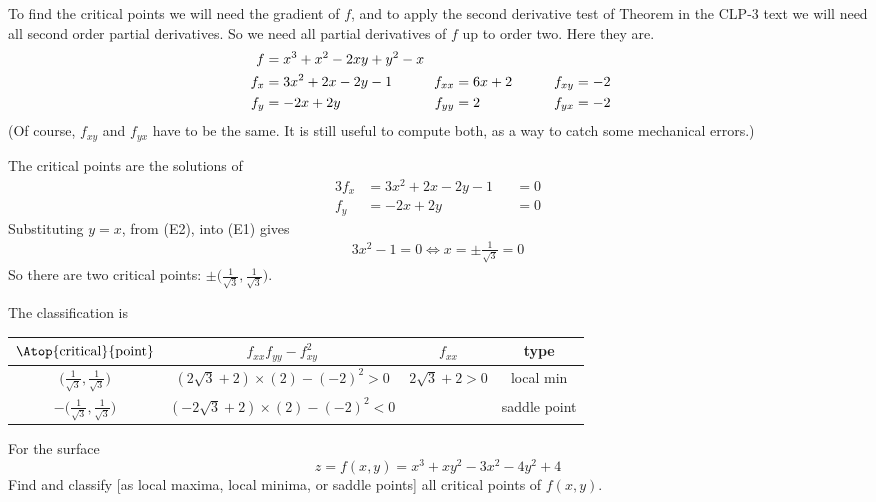 \begin{solution}
To find the critical points we will need the
gradient of $f$, and to apply the second derivative test of 
Theorem  in the CLP-3 text 
we will need all 
second order partial derivatives. So we need all partial derivatives of
$f$ up to order two.
Here they are.
\begin{alignat*}{3}
f&=x^3 + x^2 - 2xy + y^2 - x \hidewidth\\
f_x&=3x^2+2x-2y-1 \qquad   & f_{xx}&=6x+2 \qquad & f_{xy}&= -2\\
f_y&=-2x+2y  & f_{yy}&=2\qquad & f_{yx}&= -2
\end{alignat*}
(Of course, $f_{xy}$ and $f_{yx}$ have to be the same. It is still
useful to compute both, as a way to catch some mechanical errors.)

The critical points are the solutions of
\begin{alignat*}{3}
f_x&=3x^2+2x-2y-1&&=0  \tag{E1} \\
f_y&=-2x+2y &&= 0  \tag{E2}
\end{alignat*}
Substituting $y=x$, from (E2), into (E1) gives
\begin{align*}
3x^2-1=0
\iff x=\pm\frac{1}{\sqrt{3}}=0
\end{align*}
So there are two critical points: $\pm\big(\frac{1}{\sqrt{3}},\frac{1}{\sqrt{3}}\big)$.


The classification is
\begin{center}
\renewcommand{\arraystretch}{1.3}
     \begin{tabular}{|c|c|c|c|}
     \hline
    $\Atop{\text{critical}}{\text{point}}$  & $f_{xx}f_{yy}-f_{xy}^2$ & 
                                                          $f_{xx}$ & type \\    
    \hline
     $\big(\frac{1}{\sqrt{3}},\frac{1}{\sqrt{3}}\big)$  & 
           $(2\sqrt{3}+2)\times (2)-(-2)^2> 0$ &  $2\sqrt{3}+2>0$  & local min  \\ \hline
     $-\big(\frac{1}{\sqrt{3}},\frac{1}{\sqrt{3}}\big)$  & 
       $(-2\sqrt{3}+2)\times (2)-(-2)^2<0$ &  & saddle point \\  \hline
     \end{tabular}
\renewcommand{\arraystretch}{1.0}
\end{center}
\end{solution}

\begin{question}[M200 2009D] %
For the surface
\begin{equation*}
z = f (x, y) = x^3 + xy^2 - 3x^2 - 4y^2 + 4
\end{equation*}
Find and classify [as local maxima, local minima, or saddle points] all critical points of $f(x,y)$.
\end{question}

